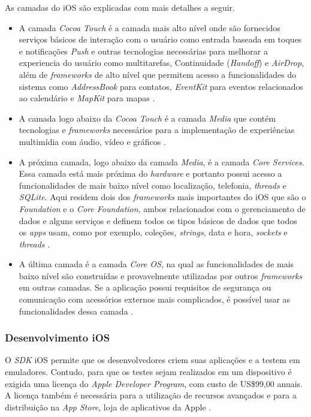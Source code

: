 As camadas do iOS são explicadas com mais detalhes a seguir.
 
\begin{itemize}
	\item A camada \textit{Cocoa Touch} é a camada mais alto nível onde são fornecidos serviços básicos de interação 
    com o usuário como entrada baseada em toques e notificações \textit{Push} e outras tecnologias necessárias para
     melhorar a experiencia do usuário como multitarefas, Continuidade (\textit{Handoff}) e \textit{AirDrop}, além de \textit{frameworks} 
     de alto nível que permitem acesso a funcionalidades do sistema como \textit{AddressBook} para contatos, \textit{EventKit} 
     para eventos relacionados ao calendário e \textit{MapKit} para mapas \cite{apple_inc_tech_2014}.
	\item A camada logo abaixo da \textit{Cocoa Touch} é a camada \textit{Media} que contém tecnologias e \textit{frameworks} necessários 
    para a implementação de experiências multimídia com áudio, vídeo e gráficos \cite{apple_inc_tech_2014}.
	\item A próxima camada, logo abaixo da camada \textit{Media}, é a camada \textit{Core Services}. Essa camada está mais próxima 
    do \textit{hardware} e portanto possui acesso a funcionalidades de mais baixo nível como localização, telefonia, \textit{threads} 
    e \textit{SQLite}. Aqui residem dois dos \textit{frameworks} mais importantes do iOS que são o \textit{Foundation} e o \textit{Core Foundation}, 
    ambos relacionados com o gerenciamento de dados e alguns serviços e definem todos os tipos básicos de dados que 
    todos os \textit{apps} usam, como por exemplo, coleções, \textit{strings}, data e hora, \textit{sockets} e \textit{threads} \cite{apple_inc_tech_2014}.
	\item A última camada é a camada \textit{Core OS}, na qual as funcionalidades de mais baixo nível são construídas e 
    provavelmente utilizadas por outros \textit{frameworks} em outras camadas. Se a aplicação possui requisitos de segurança 
    ou comunicação com acessórios externos mais complicados, é possível usar as funcionalidades dessa camada \cite{apple_inc_tech_2014}.
\end{itemize}

\subsubsection{Desenvolvimento iOS} \label{subsubsection-dev-ios}

O \textit{SDK} iOS permite que os desenvolvedores criem suas aplicações e a testem em emuladores. 
Contudo, para que os testes sejam realizados em um dispositivo é exigida uma licença do \textit{Apple Developer Program}, 
com custo de US\$99,00 anuais. A licença também é necessária para a utilização de recursos avançados e para a distribuição 
na \textit{App Store}, loja de aplicativos da Apple \cite{apple_inc_program_2016}.   

